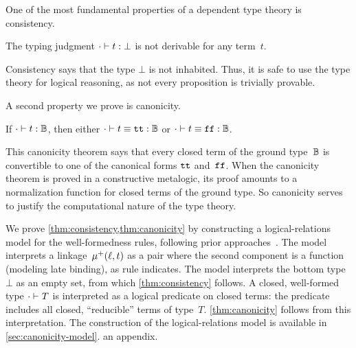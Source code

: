 One of the most fundamental properties of a dependent type theory is consistency.
\begin{theorem}[Consistency]
\label{thm:consistency}
  The typing judgment $ {\cdot} \vdash {t} : {\bot} $ is not derivable for any term~$t$.
\end{theorem}

\noindent
Consistency says that the type $\bot$ is not inhabited.
Thus, it is safe to use the type theory for logical reasoning, as not
every proposition is trivially provable.

A second property we prove is canonicity.

\begin{theorem}[Canonicity]
\label{thm:canonicity}
  If $ {\cdot} \vdash {t} : {\mathbb{B}} $, then either $ {\cdot} \vdash {t \equiv \ensuremath{\texttt{tt}}} : {\mathbb{B}} $ or $ {\cdot} \vdash {t \equiv \ensuremath{\texttt{ff}}} : {\mathbb{B}} $.
\end{theorem}

\noindent
This canonicity theorem says that every closed term of the ground
type~$\mathbb{B}$ is convertible to one of the canonical forms $\texttt{tt}$ and~$\texttt{ff}$.
When the canonicity theorem is proved in a constructive meta\-logic, its proof
amounts to a normalization function for closed terms of the ground type.
So canonicity serves to justify the computational nature of the type theory.

We prove \cref{thm:consistency,thm:canonicity} by constructing a logical-relations model
for the well-formedness rules, following prior approaches~\cite{coquand2018canonicity,kaposi2019gluing,sterling2019algebraic}.
%
The model interprets a linkage~$\mu^+({\ell},{t})$ as a pair where the
second component is a function (modeling late binding),
as rule  indicates.
%
The model interprets the bottom type~$\bot$ as an empty set, from which
\cref{thm:consistency} follows.
A closed, well-formed type $ {\cdot} \vdash_{} {T} $ is interpreted as
a logical predicate on closed terms: the predicate includes all
closed, ``reducible'' terms of type~$T$.
\cref{thm:canonicity} follows from this interpretation.
The construction of the logical-relations model is available in
\ifreport
\cref{sec:canonicity-model}.
\else
an appendix.
\fi{}